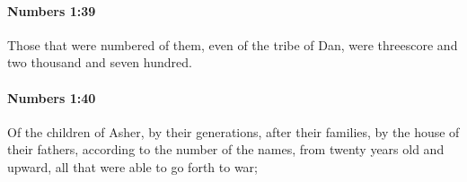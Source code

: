 		\paragraph{Numbers 1:39} %
			\label{NUMBERS-1-39}

			Those that were numbered of them, even of the tribe of Dan, were threescore and two thousand and seven hundred.


		\paragraph{Numbers 1:40} %
			\label{NUMBERS-1-40}

			Of the children of Asher, by their generations, after their families, by the house of their fathers, according to the number of the names, from twenty years old and upward, all that were able to go forth to war;



